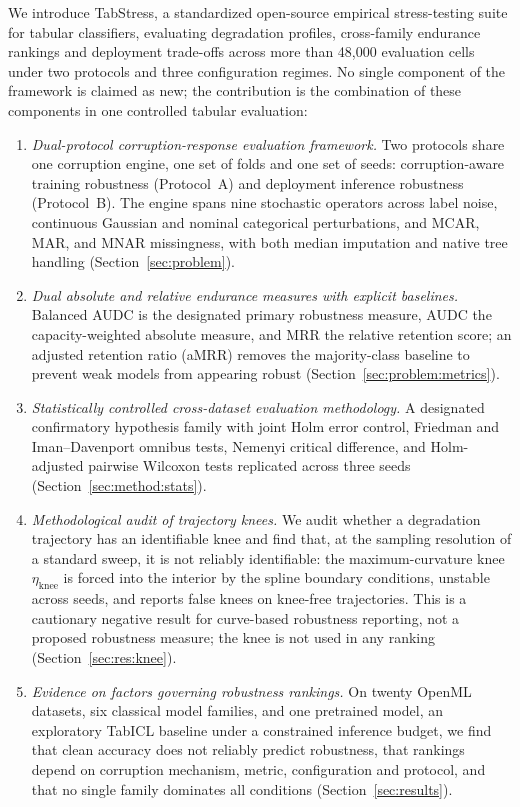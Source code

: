 \documentclass[pdflatex,sn-mathphys]{sn-jnl}
\theoremstyle{thmstyleone}
\theoremstyle{thmstyletwo}
\theoremstyle{thmstylethree}
\newcommand{\etaknee}{\eta_{\mathrm{knee}}}
\begin{document}
We introduce TabStress, a standardized open-source empirical stress-testing suite for tabular classifiers, evaluating degradation profiles, cross-family endurance rankings and deployment trade-offs across more than 48{,}000 evaluation cells under two protocols and three configuration regimes. No single component of the framework is claimed as new; the contribution is the combination of these components in one controlled tabular evaluation:
\begin{enumerate}
\item \emph{Dual-protocol corruption-response evaluation framework.} Two protocols share one corruption engine, one set of folds and one set of seeds: corruption-aware training robustness (Protocol~A) and deployment inference robustness (Protocol~B). The engine spans nine stochastic operators across label noise, continuous Gaussian and nominal categorical perturbations, and MCAR, MAR, and MNAR missingness, with both median imputation and native tree handling (Section~\ref{sec:problem}).
\item \emph{Dual absolute and relative endurance measures with explicit baselines.} Balanced AUDC is the designated primary robustness measure, AUDC the capacity-weighted absolute measure, and MRR the relative retention score; an adjusted retention ratio (aMRR) removes the majority-class baseline to prevent weak models from appearing robust (Section~\ref{sec:problem:metrics}).
\item \emph{Statistically controlled cross-dataset evaluation methodology.} A designated confirmatory hypothesis family with joint Holm error control, Friedman and Iman--Davenport omnibus tests, Nemenyi critical difference, and Holm-adjusted pairwise Wilcoxon tests replicated across three seeds (Section~\ref{sec:method:stats}).
\item \emph{Methodological audit of trajectory knees.} We audit whether a degradation trajectory has an identifiable knee and find that, at the sampling resolution of a standard sweep, it is not reliably identifiable: the maximum-curvature knee $\etaknee$ is forced into the interior by the spline boundary conditions, unstable across seeds, and reports false knees on knee-free trajectories. This is a cautionary negative result for curve-based robustness reporting, not a proposed robustness measure; the knee is not used in any ranking (Section~\ref{sec:res:knee}).
\item \emph{Evidence on factors governing robustness rankings.} On twenty OpenML datasets, six classical model families, and one pretrained model, an exploratory TabICL baseline under a constrained inference budget, we find that clean accuracy does not reliably predict robustness, that rankings depend on corruption mechanism, metric, configuration and protocol, and that no single family dominates all conditions (Section~\ref{sec:results}).
\end{enumerate}
\end{document}

